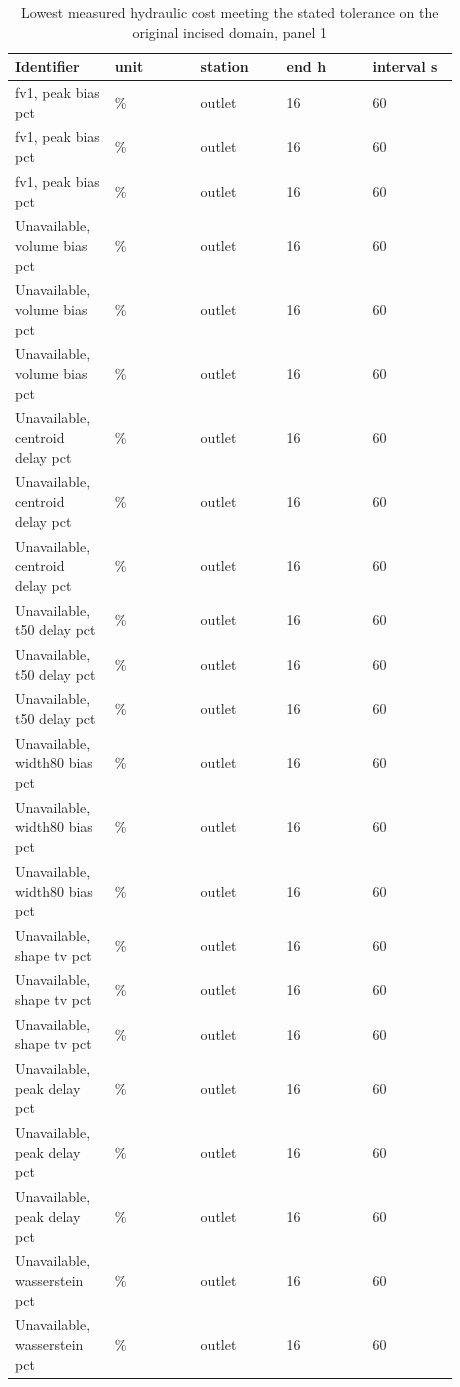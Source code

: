\begingroup
\small
\setlength{\tabcolsep}{2pt}
\begin{longtable}{p{0.1760\linewidth}p{0.1760\linewidth}p{0.1760\linewidth}p{0.1760\linewidth}p{0.1760\linewidth}}
\caption{Lowest measured hydraulic cost meeting the stated tolerance on the original incised domain, panel 1}\\
\hline
Identifier & unit & station & end h & interval s \\
\hline\endhead
fv1, peak bias pct & \% & outlet & 16 & 60 \\
fv1, peak bias pct & \% & outlet & 16 & 60 \\
fv1, peak bias pct & \% & outlet & 16 & 60 \\
Unavailable, volume bias pct & \% & outlet & 16 & 60 \\
Unavailable, volume bias pct & \% & outlet & 16 & 60 \\
Unavailable, volume bias pct & \% & outlet & 16 & 60 \\
Unavailable, centroid delay pct & \% & outlet & 16 & 60 \\
Unavailable, centroid delay pct & \% & outlet & 16 & 60 \\
Unavailable, centroid delay pct & \% & outlet & 16 & 60 \\
Unavailable, t50 delay pct & \% & outlet & 16 & 60 \\
Unavailable, t50 delay pct & \% & outlet & 16 & 60 \\
Unavailable, t50 delay pct & \% & outlet & 16 & 60 \\
Unavailable, width80 bias pct & \% & outlet & 16 & 60 \\
Unavailable, width80 bias pct & \% & outlet & 16 & 60 \\
Unavailable, width80 bias pct & \% & outlet & 16 & 60 \\
Unavailable, shape tv pct & \% & outlet & 16 & 60 \\
Unavailable, shape tv pct & \% & outlet & 16 & 60 \\
Unavailable, shape tv pct & \% & outlet & 16 & 60 \\
Unavailable, peak delay pct & \% & outlet & 16 & 60 \\
Unavailable, peak delay pct & \% & outlet & 16 & 60 \\
Unavailable, peak delay pct & \% & outlet & 16 & 60 \\
Unavailable, wasserstein pct & \% & outlet & 16 & 60 \\
Unavailable, wasserstein pct & \% & outlet & 16 & 60 \\

\end{longtable}

